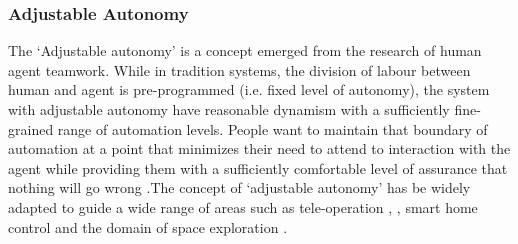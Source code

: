 
\subsubsection{Adjustable Autonomy}
The `Adjustable  autonomy' is a concept emerged from the research of human agent teamwork. While in tradition systems, the division of labour between human and agent is pre-programmed (i.e. fixed level of autonomy),  the system with adjustable autonomy have  reasonable dynamism with a sufficiently fine-grained range of automation levels. People want to maintain that boundary of automation at a point that minimizes their need to attend to interaction with the agent while providing them with a sufficiently comfortable level of assurance that nothing will go wrong \cite{Bradshaw2003}.The concept of `adjustable autonomy' has be widely adapted to guide a wide range of areas such as tele-operation \cite{Schwarz2014}, \cite{Goodrich2001a}, smart home control \cite{Costanza2014} and the domain of space exploration  \cite{Doraisa}. \\

